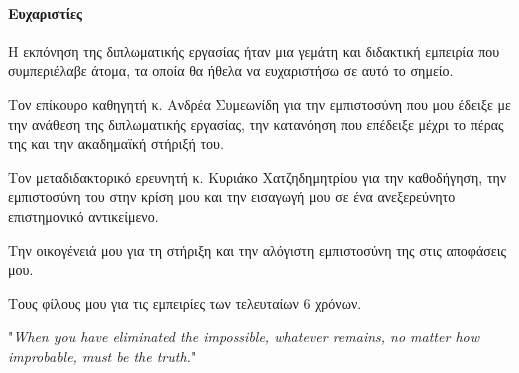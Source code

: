 {	\newpage
	\paragraph{Ευχαριστίες}
	Η εκπόνηση της διπλωματικής εργασίας ήταν μια γεμάτη και διδακτική εμπειρία που συμπεριέλαβε άτομα, τα οποία θα ήθελα να ευχαριστήσω σε αυτό το σημείο.
	
	Τον επίκουρο καθηγητή κ. Ανδρέα Συμεωνίδη για την εμπιστοσύνη  που μου έδειξε με την ανάθεση της διπλωματικής εργασίας, την κατανόηση που επέδειξε μέχρι το πέρας της και την ακαδημαϊκή στήριξή του.
	
	Τον μεταδιδακτορικό ερευνητή κ. Κυριάκο Χατζηδημητρίου για την καθοδήγηση, την εμπιστοσύνη του στην κρίση μου και την εισαγωγή μου σε ένα ανεξερεύνητο επιστημονικό αντικείμενο.
	
	Την οικογένειά μου για τη στήριξη και την αλόγιστη εμπιστοσύνη της στις αποφάσεις μου.
	
	Τους φίλους μου για τις εμπειρίες των τελευταίων 6 χρόνων.
	\newpage
}


\tableofcontents
\listoffigures
\listoftables

\pagebreak
\thispagestyle{empty}
\hspace{0pt}
\vfill
\begin{flushright}
"\textit{When you have eliminated the impossible, whatever remains, no matter how improbable, must be the truth.}"
\\[8pt]
\end{flushright}
\vfill
\hspace{0pt}
\pagebreak





